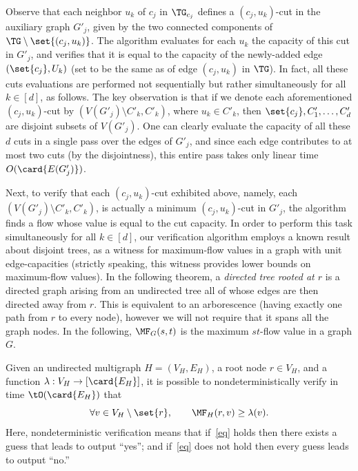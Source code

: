 Observe that each neighbor $u_k$ of $c_j$ in $\TG_{c_j}$
defines a $(c_j,u_k)$-cut in the auxiliary graph $G'_j$,
given by the two connected components of $\TG\setminus \set{(c_j,u_k)}$.
The algorithm evaluates for each $u_k$ the capacity of this cut in $G'_j$,
and verifies that it is equal to the capacity of the newly-added edge $(\set{c_j}, U_k)$ (set to be the same as of edge $(c_j, u_k)$ in $\TG$).
In fact, all these cuts evaluations are performed not sequentially
but rather simultaneously for all $k\in [d]$, as follows.
The key observation is that if we denote
each aforementioned $(c_j,u_k)$-cut by $(V(G'_j)\setminus C'_k, C'_k)$,
where $u_k\in C'_k$,
then $\set{c_j},C'_1,\ldots,C'_d$ are disjoint subsets of $V(G'_j)$.
One can clearly evaluate the capacity of all these $d$ cuts
in a single pass over the edges of $G'_j$,
and since each edge contributes to at most two cuts (by the disjointness),
this entire pass takes only linear time $O(\card{E(G'_j)})$.

Next, to verify that each $(c_j,u_k)$-cut exhibited above,
namely, each $(V(G'_j)\setminus C'_k, C'_k)$,
is actually a minimum $(c_j,u_k)$-cut in $G'_j$,
the algorithm finds a flow whose value is equal to the cut capacity.
In order to perform this task simultaneously for all $k\in[d]$,
our verification algorithm employs a known result about disjoint trees,
as a witness for maximum-flow values in a graph with unit edge-capacities
(strictly speaking, this witness provides lower bounds on maximum-flow values).
In the following theorem, a \emph{directed tree rooted at $r$}
is a directed graph arising from an undirected tree
all of whose edges are then directed away from $r$.
This is equivalent to an arborescence
(having exactly one path from $r$ to every
%
%
node),   %
however we will not require that it spans all the graph nodes. In the following, $\MF_{G}(s,t)$ is the maximum $st$-flow value in a graph $G$.


\begin{lemma}\label{lemma:packing}
Given an undirected multigraph $H=(V_H,E_H)$, a root node $r\in V_H$, and a function $\lambda:V_H\rightarrow [\card{E_H}]$, it is possible to nondeterministically verify in time $\tO(\card{E_H})$ that
\begin{equation}\label{eq}
  \forall v\in V_H\setminus\set{r},
  \qquad
  \MF_{H}(r,v)\geq \lambda(v).
\end{equation}
Here, nondeterministic verification means that
if~\eqref{eq} holds then there exists a guess that leads to output ``yes'';
and if~\eqref{eq} does not hold then every guess leads to output ``no.''
\end{lemma}

